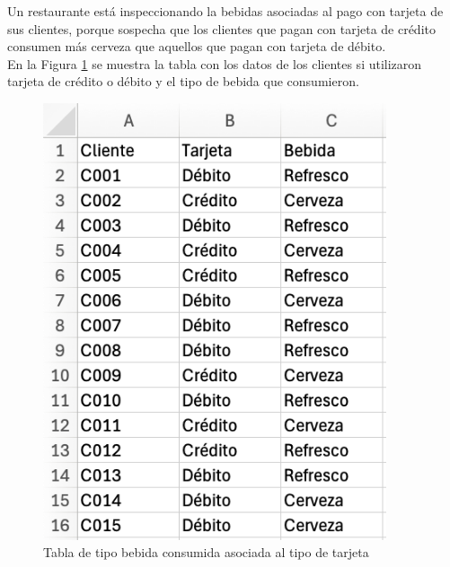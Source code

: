 \documentclass{article}
\begin{document}
Un restaurante está inspeccionando la bebidas asociadas al pago con tarjeta de sus clientes, porque sospecha que los clientes que pagan con tarjeta de crédito consumen más cerveza que aquellos que pagan con tarjeta de débito.
\\[12pt]
En la Figura \ref{fig:p202} se muestra la tabla con los datos de los clientes si utilizaron tarjeta de crédito o débito y el tipo de bebida que consumieron.
\begin{figure}[!h]
    \centering
    \begin{minipage}{\textwidth}
        \centering
        \includegraphics[width=0.9\textwidth]{figures/p202.png}
    \end{minipage}
    \captionsetup{width=0.9\textwidth}
    \caption{Tabla de tipo bebida consumida asociada al tipo de tarjeta}
    \label{fig:p202}
\end{figure}
\\
\end{document}
